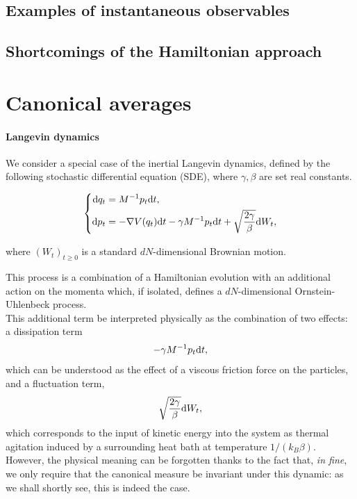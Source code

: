     \subsection{Examples of instantaneous observables}
        
    \subsection{Shortcomings of the Hamiltonian approach}

\section{Canonical averages}

\paragraph{Langevin dynamics}
We consider a special case of the inertial Langevin dynamics, defined by the following stochastic differential equation (SDE), where $\gamma, \beta$ are set real constants.

\begin{equation}
    \label{Langevin}
    \left\{\begin{aligned}
        \text dq_t&=M^{-1}p_t\text{d}t,\\
        \text dp_t&= -\nabla V(q_t)\text{d}t -\gamma M^{-1}p_t\text{d}t+\sqrt{\frac{2\gamma}\beta}\text dW_t,
    \end{aligned}\right.
\end{equation}

where $(W_t)_{t\geq 0}$ is a standard $dN$-dimensional Brownian motion.

This process is a combination of a Hamiltonian evolution with an additional action on the momenta which, if isolated, defines a $dN$-dimensional Ornstein-Uhlenbeck process.\\
This additional term be interpreted physically as the combination of two effects: a dissipation term 
$$-\gamma M^{-1}p_t\text{d}t,$$
which can be understood as the effect of a viscous friction force on the particles, and a fluctuation term, 
$$\sqrt{\frac{2\gamma}\beta}\text dW_t,$$
which corresponds to the input of kinetic energy into the system as thermal agitation induced by a surrounding heat bath at temperature $1/(k_B\beta)$.\\
However, the physical meaning can be forgotten thanks to the fact that, \textit{in fine}, we only require that the canonical measure be invariant under this dynamic: as we shall shortly see, this is indeed the case.

